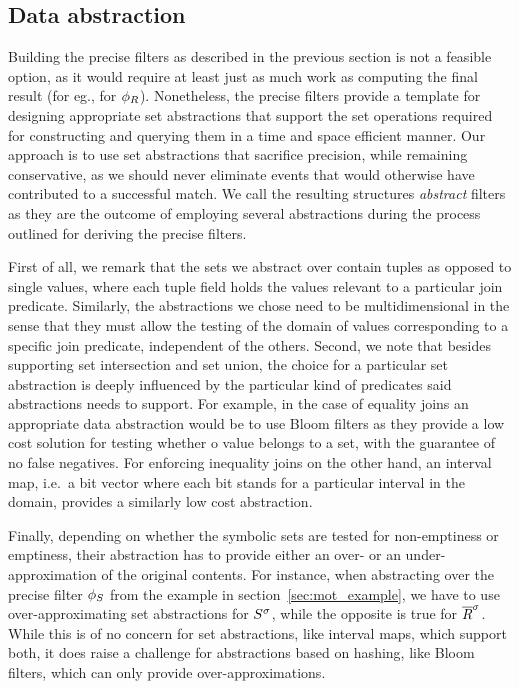 \subsection{Data abstraction}
\label{sec:data_abstraction}


Building the precise filters as described in the previous section is not a 
feasible option, as it would require at least just as much work as computing 
the final result (for eg., for $\phi_{R}$).
Nonetheless, the precise filters provide a template for designing 
appropriate set abstractions that support the set operations required for 
constructing and querying them in a time and space efficient manner. 
Our approach is to use set abstractions that sacrifice precision, while 
remaining conservative, as we should never eliminate events that would 
otherwise have contributed to a successful match.
We call the resulting structures {\em abstract} filters as they are the outcome 
of employing several abstractions during the process outlined for deriving the 
precise filters.  


First of all, we remark that the sets we abstract over contain tuples as 
opposed to single values, where each tuple field holds the values relevant to a 
particular join predicate. 
Similarly, the abstractions we chose need to be multidimensional in the sense 
that they must allow the testing of the domain of values corresponding to a 
specific join predicate, independent of the others.  
Second, we note that besides supporting set intersection and set union, the 
choice for a particular set abstraction is deeply influenced by the particular 
kind of predicates said abstractions needs to support.
For example, in the case of equality joins an appropriate data abstraction 
would be to use Bloom filters as they provide a low cost solution for testing 
whether o value belongs to a set, with the guarantee of no false negatives.
For enforcing inequality joins on the other hand, an interval map, i.e.\ a 
bit vector where each bit stands for a particular interval in the domain,
provides a similarly low cost abstraction.  

Finally, depending on whether the symbolic sets are tested for non-emptiness or 
emptiness, their abstraction has to provide either an over- or an 
under-approximation of the original contents.
For instance, when abstracting over the precise filter $\phi_{S}$ from the 
example in section~\ref{sec:mot_example}, we have to use over-approximating set 
abstractions for ${S}^{\sigma}$, while the opposite is true for ${\overline{R}}^{\sigma}$.
While this is of no concern for set abstractions, like interval maps, which 
support both, it does raise a challenge for abstractions based on hashing, like 
Bloom filters, which can only provide over-approximations.


